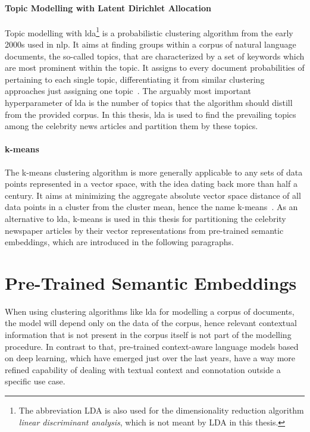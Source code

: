 \paragraph{Topic Modelling with Latent Dirichlet Allocation}\label{ch:lda}
Topic modelling with \gls{lda}\footnote{The abbreviation LDA is also used for the dimensionality reduction algorithm \textit{linear discriminant analysis}, which is not meant by LDA in this thesis.} is a probabilistic clustering algorithm from the early 2000s used in \gls{nlp}. It aims at finding groups within a corpus of natural language documents, the so-called topics, that are characterized by a set of keywords which are most prominent within the topic. It assigns to every document probabilities of pertaining to each single topic, differentiating it from similar clustering approaches just assigning one topic~\autocite{blei_latent_2003, blei_probabilistic_2012}. The arguably most important hyperparameter of \gls{lda} is the number of topics that the algorithm should distill from the provided corpus. In this thesis, \gls{lda} is used to find the prevailing topics among the celebrity news articles and partition them by these topics.

\paragraph{k-means}
The k-means clustering algorithm is more generally applicable to any sets of data points represented in a vector space, with the idea dating back more than half a century. It aims at minimizing the aggregate absolute vector space distance of all data points in a cluster from the cluster mean, hence the name k-means~\autocite{macqueen_methods_1967}. As an alternative to \gls{lda}, k-means is used in this thesis for partitioning the celebrity newspaper articles by their vector representations from pre-trained semantic embeddings, which are introduced in the following paragraphs.



\section{Pre-Trained Semantic Embeddings}\label{ch:pretrained_algorithms}
When using clustering algorithms like \gls{lda} for modelling a corpus of documents, the model will depend only on the data of the corpus, hence relevant contextual information that is not present in the corpus itself is not part of the modelling procedure. 
In contrast to that, pre-trained context-aware language models based on deep learning, which have emerged just over the last years, have a way more refined capability of dealing with textual context and connotation outside a specific use case.


